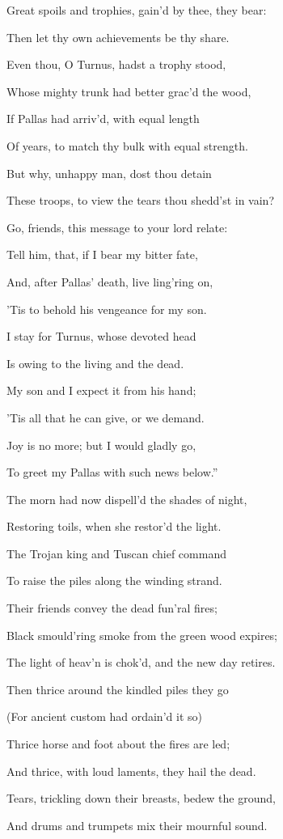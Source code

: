 Great spoils and trophies, gain’d by thee, they bear:

Then let thy own achievements be thy share.

Even thou, O Turnus, hadst a trophy stood,

Whose mighty trunk had better grac’d the wood,

If Pallas had arriv’d, with equal length

Of years, to match thy bulk with equal strength.

But why, unhappy man, dost thou detain

These troops, to view the tears thou shedd’st in vain?

Go, friends, this message to your lord relate:

Tell him, that, if I bear my bitter fate,

And, after Pallas’ death, live ling’ring on,

’Tis to behold his vengeance for my son.

I stay for Turnus, whose devoted head

Is owing to the living and the dead.

My son and I expect it from his hand;

’Tis all that he can give, or we demand.

Joy is no more; but I would gladly go,

To greet my Pallas with such news below.”

The morn had now dispell’d the shades of night,

Restoring toils, when she restor’d the light.

The Trojan king and Tuscan chief command

To raise the piles along the winding strand.

Their friends convey the dead fun’ral fires;

Black smould’ring smoke from the green wood expires;

The light of heav’n is chok’d, and the new day retires.

Then thrice around the kindled piles they go

(For ancient custom had ordain’d it so)

Thrice horse and foot about the fires are led;

And thrice, with loud laments, they hail the dead.

Tears, trickling down their breasts, bedew the ground,

And drums and trumpets mix their mournful sound.

